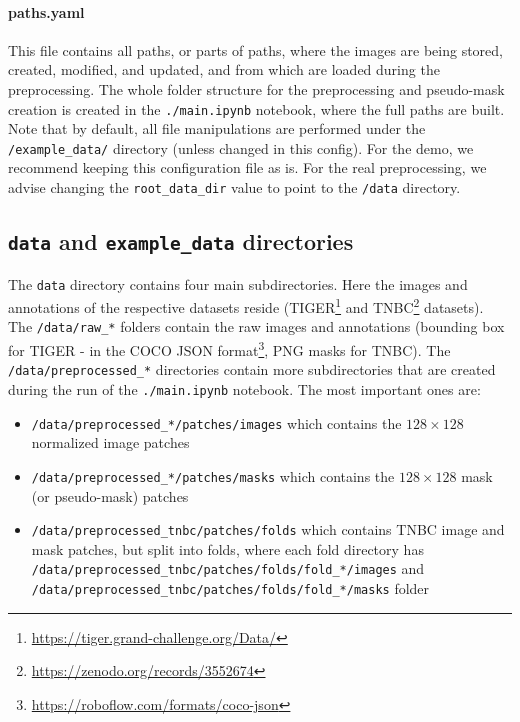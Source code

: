 \paragraph{paths.yaml}
This file contains all paths, or parts of paths, where the images are
being stored, created, modified, and updated, and from which are loaded
during the preprocessing. The whole folder structure for the
preprocessing and pseudo-mask creation is created in the
\texttt{./main.ipynb} notebook, where the full paths are built. Note that by default, all file manipulations are performed under
the \texttt{/example\_data/} directory (unless changed in this config).
For the demo, we recommend keeping this
configuration file as is. For the real preprocessing, we advise changing the
\texttt{root\_data\_dir} value to point to the \texttt{/data} directory.

\subsection{\texttt{data} and \texttt{example\_data} directories}\label{data-and-example_data-directories}

The \texttt{data} directory contains four main subdirectories. Here the
images and annotations of the respective datasets reside
(TIGER\footnote{\url{https://tiger.grand-challenge.org/Data/}} and TNBC\footnote{\url{https://zenodo.org/records/3552674}} datasets). The
\texttt{/data/raw\_*} folders contain the raw images and annotations
(bounding box for TIGER - in the COCO JSON format\footnote{\url{https://roboflow.com/formats/coco-json}}, PNG
masks for TNBC). The \texttt{/data/preprocessed\_*} directories contain
more subdirectories that are created during the run of the
\texttt{./main.ipynb} notebook. The most important ones are:

\begin{itemize}
\item
  \texttt{/data/preprocessed\_*/patches/images} which contains the
  $128\!\times\!128$ normalized image patches
\item
  \texttt{/data/preprocessed\_*/patches/masks} which contains the
  $128\!\times\!128$ mask (or pseudo-mask) patches
\item
  \texttt{/data/preprocessed\_tnbc/patches/folds} which contains TNBC
  image and mask patches, but split into folds, where each fold directory
  has \texttt{/data/preprocessed\_tnbc/patches/folds/fold\_*/images} and
  \texttt{/data/preprocessed\_tnbc/patches/folds/fold\_*/masks} folder
\end{itemize}

